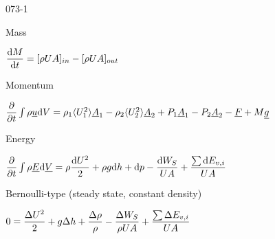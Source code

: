 \begin{mitframe}{073-1}
  \begin{listone}
  	\item Mass
    	\begin{listtwo}
        	\item $\dfrac{\mathrm{d}M}{\mathrm{d}t}=[\dens\uvel\helmholtz]_{in}-[\dens\uvel\helmholtz]_{out}$
        \end{listtwo}
    \item Momentum
    	\begin{listtwo}
        	\item $\dfrac{\partial}{\partial{t}}\int\dens\uline{\forcepot}\mathrm{d}\vol=\dens_{1}\langle\uvel_1^2\rangle\uline{\helmholtz}_1 -\dens_2\langle\uvel_2^2\rangle\uline{\helmholtz}_2+\p_1\uline{\helmholtz}_1-\p_2\uline{\helmholtz}_2-\uline{\force}+M\uline{\grav}$
            
        \end{listtwo}
    \item Energy
  		\begin{listtwo}
			\item $\dfrac{\partial}{\partial{t}}\int\dens\uline{\energy}\mathrm{d}\uline{\vol}=\dens\dfrac{\mathrm{d}\uvel^2}{2}+\dens\grav\mathrm{d}\heattranscoeff+\mathrm{d}p-\dfrac{\mathrm{d}\work_{\entropy}}{\uvel\helmholtz}+\dfrac{\sum\nolimits\mathrm{d}\energy_{\vvel, \state}}{\uvel\helmholtz}$
            \item Bernoulli-type (steady state, constant density)
                     \begin{listthree}
                     	\item $0=\dfrac{\iipf\uvel^2}{2}+\grav\iipf\heattranscoeff+\dfrac{\iipf\dens}{\dens}-\dfrac{\iipf\work_{\entropy}}{\dens\uvel\helmholtz}+\dfrac{\sum\nolimits\iipf\energy_{\vvel,\state}}{\uvel\helmholtz}$
                     \end{listthree}
        \end{listtwo}
  \end{listone}  

\end{mitframe}